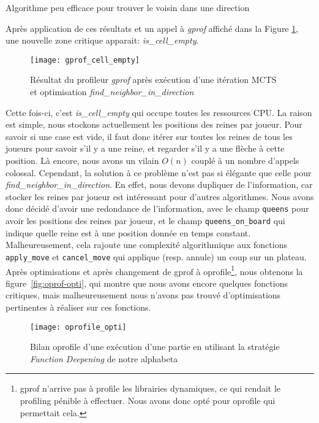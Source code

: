 \begin{algorithm}
	\caption{Algorithme peu efficace pour trouver le voisin dans une direction}
	\label{alg:find_neighbor_opti}
\end{algorithm}

Après application de ces résultats et un appel à \textit{gprof} affiché dans la Figure \ref{fig:gprof-empty-cell},
une nouvelle zone critique apparait: \emph{is\_cell\_empty}.
\begin{figure}[H]
	\centering
	\texttt{[image: gprof\_cell\_empty]}
	\captionsetup{justification=centering}
	\caption{Résultat du profileur \textit{gprof} après exécution d'une itération MCTS \\et optimisation \textit{find\_neighbor\_in\_direction}}
	\label{fig:gprof-empty-cell}
\end{figure}

Cette fois-ci, c'est \textit{is\_cell\_empty} qui occupe toutes les ressources CPU. La raison est simple,
nous stockons actuellement les positions des reines par joueur. Pour savoir si une case est vide,
il faut donc itérer sur toutes les reines de tous les joueurs pour savoir s'il y a une reine, et regarder s'il y a une flèche à cette position.
Là encore, nous avons un vilain $O(n)$ couplé à un nombre d'appels colossal. Cependant, la solution à ce problème
n'est pas si élégante que celle pour \textit{find\_neighbor\_in\_direction}. En effet,
nous devons dupliquer de l'information, car stocker les reines par joueur est intéressant pour d'autres algorithmes.
Nous avons donc décidé d'avoir une redondance de l'information, avec le champ \verb|queens| pour
avoir les positions des reines par joueur, et le champ \verb|queens_on_board| qui indique quelle reine est
à une position donnée en temps constant. Malheureusement, cela rajoute une complexité algorithmique aux fonctions \verb|apply_move| et \verb|cancel_move|
qui applique (resp. annule) un coup sur un plateau. Après optimisations et après changement de gprof à oprofile\footnote{gprof n'arrive pas à profile les librairies dynamiques, ce qui rendait le profiling pénible à effectuer. Nous avons donc opté pour oprofile qui permettait cela.},
nous obtenons la figure~\ref{fig:oprof-opti}, qui montre que nous avons encore quelques fonctions critiques, mais malheureusement nous
n'avons pas trouvé d'optimisations pertinentes à réaliser sur ces fonctions.

\begin{figure}[H]
	\centering
	\texttt{[image: oprofile\_opti]}
	\captionsetup{justification=centering}
	\caption{Bilan oprofile d'une exécution d'une partie en utilisant la stratégie \emph{Function Deepening} de notre alphabeta}
\end{figure}